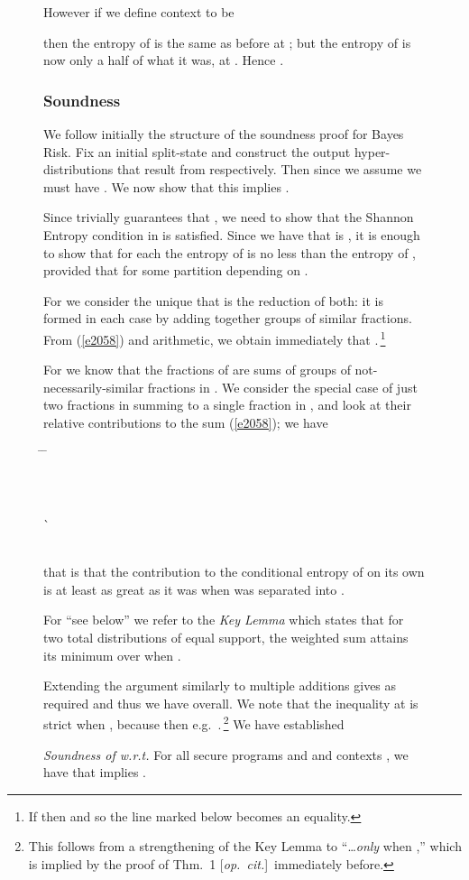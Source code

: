 \documentclass[runningheads]{llncs}
\newcommand{\Ht}{\mathsf{H}}
\newcommand\Eqn[1] {(\ref{#1})}
\newcommand\Spot {\raisebox{-.1em}{\Large\boldmath}}
\newcommand\NLg {\textrm{l}\overline{\textrm{g}}}
\renewcommand\NLg {\overline{\lg}}
\newcommand\Norm[1]{[#1]}
\newcommand\In {{:}\,}
\newenvironment{Reason}{\vspace{-.0em}\begin{tabbing}\hspace{2em}\= \hspace{1cm} \= \kill}{\end{tabbing}\vspace{-1em}}
\newcommand\Step[2] {#1 \>  \\}
\newcommand\StepR[3] {#1 \>  \` {\RF \makebox[0pt][r]{\begin{tabular}[t]{r}``#2''\end{tabular}}} \\}
\newcommand\RF {\small}
\newcommand{\EXP}{\mathop{\sum\kern-.45cm\sum}}
\renewcommand{\EXP}{+}
\renewcommand{\EXP}{{\cal E}}
\renewcommand{\EXP}{\otimes}
\renewcommand{\EXP}{\odot}
\newcommand\Exp[2]{(\kern-.25ex\EXP\,#1\bgroup\def\Elem{#2}\ifx\Elem\empty\egroup\else\egroup\mathrel{\Spot}#2\fi)}
\newenvironment{Figure}[2][t]{\begin{figure}[#1]\def\Label{#2}\small}{\label{\Label}\end{figure}}
\newenvironment{Theorem}[2]{\begin{theorem}\label{#2}\textit{#1}\rm\quad}{\hfill\end{theorem}}
\begin{document}
\begin{Figure}[ht!]{f1228}
However if we define context  to be 
 
then the entropy of  is the same as before at ; but the entropy of  is now only a half of what it was, at . Hence .

\subsubsection{Soundness}

We follow initially the structure of the soundness proof for Bayes Risk. Fix an initial split-state and construct the output hyper-distributions  that result from  respectively. Then since we assume  we must have . We now show that this implies .

Since  trivially guarantees that , we need to show that the Shannon Entropy condition in  is satisfied. Since we have that  is , it is enough to show that for each  the entropy of  is no less than the entropy of , provided that  for some partition  depending on .

For  we consider the unique  that is the reduction of both: it is formed in each case by adding together groups of similar fractions. From \Eqn{e2058} and arithmetic, we obtain immediately that .\,\footnote{If  then  and so the line marked  below becomes an equality.}

For  we know that the fractions of  are sums of groups of not-necessarily-similar fractions in . We consider the special case of just two fractions  in  summing to a single fraction  in , and look at their relative contributions to the sum \Eqn{e2058}; we have
\begin{Reason}
\Step{}{
 \Ht.\pi
}
\Step{}{
 \Ht.(\pi_1{+}\pi_2)
}
\Step{}{
 \Exp{d\In(\pi_1{+}\pi_2)}{\NLg(\Norm{\pi_1{+}\pi_2}.d)}
}
\Step{}{
 \Exp{d\In\pi_1}{\NLg(\Norm{\pi_1{+}\pi_2}.d)} + \Exp{d\In\pi_2}{\NLg(\Norm{\pi_1{+}\pi_2}.d)}
}
\StepR{\dagger}{see below}{
 \Exp{d\In\pi_1}{\NLg(\Norm{\pi_1}.d)} + \Exp{d\In\pi_2}{\NLg(\Norm{\pi_2}.d)}
}
\Step{}{
 \Ht.\pi_1 + \Ht.\pi_2 ~,
}
\end{Reason}
that is that the contribution to the conditional entropy of  on its own is at least as great as it was when was separated into .

For ``see below'' we refer to the \emph{Key Lemma} \cite[p5]{Welsh:88} which states that for two total distributions  of equal support, the weighted sum  attains its minimum over  when .

Extending the argument similarly to multiple additions gives  as required and thus we have  overall. We note that the inequality at  is strict when , because then e.g.\ .\,\footnote{This follows from a strengthening of the Key Lemma to ``\ldots\emph{only} when ,'' which is implied by the proof of Thm.~1 [\textit{op.\ cit.}]\ immediately before.}
We have established
\begin{Theorem}{Soundness of  w.r.t. }{t2112}
For all secure programs  and  and contexts , we have that  implies .
\end{Theorem}


\end{Figure}
\end{document}
